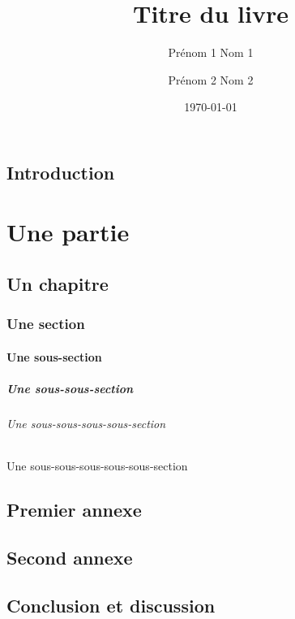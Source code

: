 \documentclass[a4paper]{report}
\title{Titre du livre}
\author{Prénom 1 Nom 1 \and Prénom 2 Nom 2}
\date{\today}
\begin{document}
 
\maketitle
 
    \chapter*{Introduction}
 
    \part{Une partie}
    \chapter{Un chapitre}
    \section{Une section}
    \subsection{Une sous-section}
    \subsubsection{Une sous-sous-section}
    \paragraph{Une sous-sous-sous-sous-section}
    \subparagraph{Une sous-sous-sous-sous-sous-section}
 
    \appendix
 
    \chapter{Premier annexe}
    \chapter{Second annexe}
 
    \chapter*{Conclusion et discussion}
 
    \tableofcontents    %
    \listoffigures        %
    \listoftables        %
 
\end{document}
